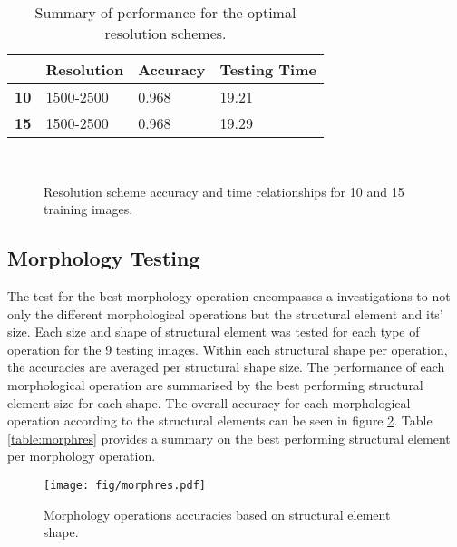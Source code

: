\begin{table}[H]
\centering
\caption{Summary of performance for the optimal resolution schemes.}

\begin{tabular}{|l|l|l|l|}
\hline
&	\textbf{Resolution} & \textbf{Accuracy} & \textbf{Testing Time}\\
\hline
\textbf{10} & 1500-2500 & 0.968 & 19.21\\
\hline				    	 			
\textbf{15} & 1500-2500 & 0.968 & 19.29\\	
\hline		    	 
\end{tabular}
\label{table:multiresres}
\end{table}

\begin{figure}[H]
    \centering
    \\
    \caption{Resolution scheme accuracy and time relationships for 10 and 15 training images.}%
    \label{reg: multires10}
\end{figure}

\subsection{Morphology Testing} 
The test for the best morphology operation encompasses a investigations to not only the different morphological operations but the structural element and its' size. Each size and shape of structural element was tested for each type of operation for the 9 testing images. Within each structural shape per operation, the accuracies are averaged per structural shape size. The performance of each morphological operation are summarised by the best performing structural element size for each shape. The overall accuracy for each morphological operation according to the structural elements can be seen in figure \ref{fig:morphres}. Table \ref{table:morphres} provides a summary on the best performing structural element per morphology operation.

\begin{figure}[H]
\centering
\texttt{[image: fig/morphres.pdf]}
\caption{Morphology operations accuracies based on structural element shape.}
\label{fig:morphres}
\end{figure}

